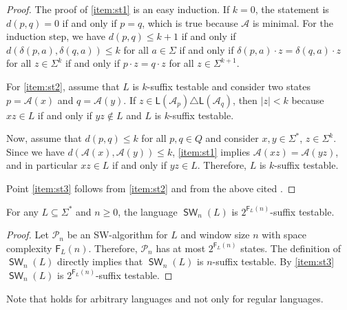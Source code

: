 \documentclass{theoretics}
\newcommand{\A}{\mathcal{A}}
\renewcommand{\P}{\mathcal{P}}
\newcommand{\F}{\mathsf{F}}
\renewcommand{\L}{\mathsf{L}}
\DeclareMathOperator{\SW}{\mathsf{SW}}
\renewcommand{\geq}{\geqslant}
\renewcommand{\leq}{\leqslant}
\renewcommand{\ge}{\geq}
\renewcommand{\le}{\leq}
\begin{document}
\begin{proof}
	The proof of \ref{item:st1} is an easy induction.
	If $k=0$, the statement is $d(p,q) = 0$ if and only if $p = q$,
	which is true because $\A$ is minimal. For the induction step, we have
	$d(p,q) \le k+1$ if and only if $d(\delta(p,a),\delta(q,a)) \le k$
	for all $a \in \Sigma$ if and only if $\delta(p,a) \cdot z = \delta(q,a) \cdot z$ for all $z \in \Sigma^{k}$
	if and only if $p \cdot z = q \cdot z$
	for all $z \in \Sigma^{k+1}$.
					
	For \ref{item:st2}, assume that $L$ is $k$-suffix testable and consider two states $p = \A(x)$ and $q= \A(y)$.
	If $z \in \L(\A_p) \triangle \L(\A_q)$, then $|z| < k$ because $xz \in L$ if and only if $yz \notin L$
	and $L$ is $k$-suffix testable.
						
	Now, assume that $d(p,q) \le k$ for all $p,q \in Q$ and consider $x,y \in \Sigma^*$, $z \in \Sigma^k$.
	Since we have $d(\A(x),\A(y)) \le k$, \ref{item:st1} implies $\A(xz) = \A(yz)$, and in particular $xz \in L$ if and only if $yz \in L$.
	Therefore, $L$ is $k$-suffix testable.
						
						
	Point \ref{item:st3} follows from \ref{item:st2} and from the above cited \cite[Lemma~1]{GawrychowskiJ09}.
\end{proof}

\begin{lemma}\label{thm:suffix-language}
	For any $L \subseteq \Sigma^*$ and $n \ge 0$,
	the language $\SW_n(L)$ is $2^{\F_L(n)}$-suffix testable.
\end{lemma}
\begin{proof}
	Let $\P_n$ be an SW-algorithm for $L$ and window size $n$
	with space complexity $\F_L(n)$.
	Therefore, $\P_n$ has at most $2^{\F_L(n)}$ states.
	The definition of $\SW_n(L)$ directly implies that $\SW_n(L)$ is $n$-suffix testable.
	By \ref{item:st3} $\SW_n(L)$ is $2^{\F_L(n)}$-suffix testable.
\end{proof}
Note that  holds for arbitrary languages and not only for regular languages.
\end{document}
